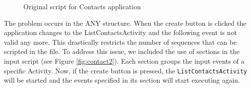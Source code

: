 \documentclass{acm_proc_article-sp}
\begin{document}
\begin{figure}
\vspace{-15pt}
\caption{Original script for Contacts application}
\label{fig:contact}
\end{figure}

The problem occurs in the ANY structure. When the create button is clicked the application changes to the ListContactsActivity
and the following event is not valid any more. This drastically restricts the number of sequences that can be scripted in the file. To
address this issue, we included the use of sections in the input script (see Figure \ref{fig:contact2}). Each section groups the input
events of a specific Activity. Now, if the create button is pressed, the \texttt{ListContactsActivity} will be started and the events
specified in its section will start executing again.
\end{document}
